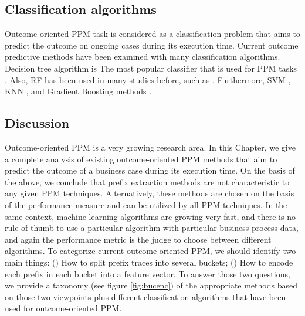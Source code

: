 \subsection{Classification algorithms}
Outcome-oriented PPM task is considered as a classification problem that aims to predict the outcome on ongoing cases during its execution time. Current outcome predictive methods have been examined with many classification algorithms. Decision tree algorithm is The most popular classifier that is used for PPM tasks \cite{de2016general, grigori2001improving, maggi2014predictive}. Also, RF has been used in many studies before, such as \cite{leontjeva2016complex, ghattas2014improving}. Furthermore, SVM \cite{schwegmann2013method}, KNN \cite{van2012process}, and Gradient Boosting methods \cite{teinemaa2019outcome}. 

\subsection{Discussion}
Outcome-oriented PPM is a very growing research area. In this Chapter, we give a complete analysis of existing outcome-oriented PPM methods that aim to predict the outcome of a business case during its execution time. On the basis of the above, we conclude that prefix extraction methods are  not characteristic to any given PPM techniques. Alternatively, these methods are chosen on the basis of the performance measure and can be utilized by all PPM techniques. In the same context, machine learning algorithms are growing very fast, and there is no rule of thumb to use a particular algorithm with particular business process data, and again the performance metric is the judge to choose between different algorithms. 
To categorize current outcome-oriented PPM, we should identify two main things: () How to split prefix traces into several buckets; () How to encode each prefix in each bucket into a feature vector.  To answer those two questions, we provide a taxonomy (see figure \ref{fig:bucenc}) of the appropriate methods based on those two viewpoints plus different classification algorithms that have been used for outcome-oriented PPM. 

